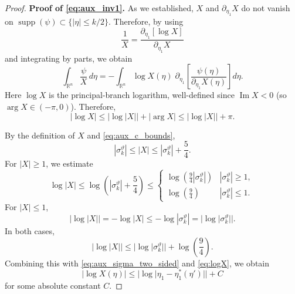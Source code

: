 \documentclass[12pt,a4paper]{amsart}
\numberwithin{equation}{section}
\theoremstyle{plain}
\theoremstyle{definition}
\begin{document}
\begin{proof}
\textbf{Proof of \eqref{eq:aux_inv1}.}
As we established, $X$ and $\partial_{\eta_1} X$ do not vanish on $\operatorname{supp} (\psi) \subset \{|\eta|\leq k/2\}$. Therefore, by using
\begin{equation*}
    \frac{1}{X} = \frac{\partial_{\eta_1}[\log X]}{\partial_{\eta_1} X}
\end{equation*}
and integrating by parts, we obtain
\begin{equation}\label{eq:aux_IBP}
  \int_{\mathbb{R}^n}\frac{\psi}{X}\,d\eta
  = -\int_{\mathbb{R}^n}\log X(\eta)\;\partial_{\eta_1}\!\left[
      \frac{\psi(\eta)}{\partial_{\eta_1}X(\eta)}
    \right]d\eta.
\end{equation}
Here $\log X$ is the principal-branch logarithm, well-defined since
$\operatorname{Im} X<0$ (so $\arg X\in(-\pi,0)$). Therefore,
\begin{equation}\label{eq:logX}
    |\log X| \leq |\log |X|| + |\arg X| \leq |\log |X|| + \pi.
\end{equation}

By the definition of $X$ and \eqref{eq:aux_c_bounds},
\begin{equation*}
    |\sigma_k^\vartheta| \leq |X| \leq |\sigma_k^\vartheta|  + \frac{5}{4}.
\end{equation*}
For $|X|\geq 1$, we estimate
\begin{equation*}
    \log |X| \leq \log \left(|\sigma_k^\vartheta|  + \frac{5}{4}\right) \leq 
    \begin{cases}
        \log\left(\frac{9}{4}|\sigma_k^\vartheta| \right) & |\sigma_k^\vartheta| \geq 1,\\
        \log\left(\frac{9}{4} \right) & |\sigma_k^\vartheta| \leq 1.\
    \end{cases}
\end{equation*}
For $|X|\leq 1$,
\begin{equation*}
    |\log |X|| = - \log |X|\leq - \log |\sigma_k^\vartheta| = |\log |\sigma_k^\vartheta||.
\end{equation*}
In both cases,
\begin{equation*}
    |\log |X|| \leq |\log |\sigma_k^\vartheta|| + \log\left(\frac{9}{4} \right).
\end{equation*}
Combining this with \eqref{eq:aux_sigma_two_sided} and \eqref{eq:logX}, we obtain
\begin{equation}\label{eq:aux_logX}
  |\log X(\eta)|\le|\log|\eta_1-\eta_1^*(\eta')||+C
\end{equation}
for some absolute constant $C$.


\end{proof}
\end{document}
